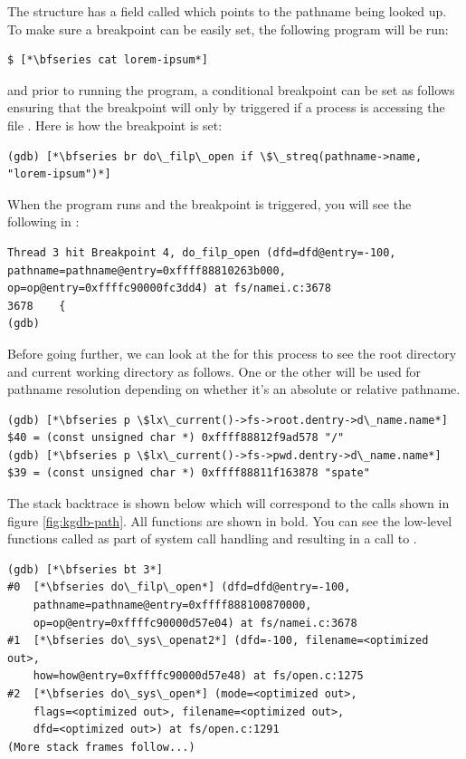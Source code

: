 \noindent
The  structure has a field called  which points to the pathname being looked up. To make sure a breakpoint can be easily set, the following program will be run:

\begin{lstlisting}
$ [*\bfseries cat lorem-ipsum*]
\end{lstlisting}

\noindent
and prior to running the program, a conditional breakpoint can be set as follows ensuring that the breakpoint will only by triggered if a process is accessing the file . Here is how the breakpoint is set:

\begin{lstlisting}
(gdb) [*\bfseries br do\_filp\_open if \$\_streq(pathname->name, "lorem-ipsum")*]
\end{lstlisting}

\noindent
When the program runs and the breakpoint is triggered, you will see the following in :

\begin{lstlisting}
Thread 3 hit Breakpoint 4, do_filp_open (dfd=dfd@entry=-100, 
pathname=pathname@entry=0xffff88810263b000, 
op=op@entry=0xffffc90000fc3dd4) at fs/namei.c:3678
3678	{
(gdb) 
\end{lstlisting}

\noindent
Before going further, we can look at the  for this process to see the root directory and current working directory as follows. One or the other will be used for pathname resolution depending on whether it's an absolute or relative pathname.

\begin{lstlisting}
(gdb) [*\bfseries p \$lx\_current()->fs->root.dentry->d\_name.name*]
$40 = (const unsigned char *) 0xffff88812f9ad578 "/"
(gdb) [*\bfseries p \$lx\_current()->fs->pwd.dentry->d\_name.name*]
$39 = (const unsigned char *) 0xffff88811f163878 "spate"
\end{lstlisting}

\noindent
The stack backtrace is shown below which will correspond to the calls shown in figure \ref{fig:kgdb-path}. All functions are shown in bold. You can see the low-level functions called as part of system call handling and resulting in a call to .

\begin{lstlisting}
(gdb) [*\bfseries bt 3*]
#0  [*\bfseries do\_filp\_open*] (dfd=dfd@entry=-100, 
    pathname=pathname@entry=0xffff888100870000, 
    op=op@entry=0xffffc90000d57e04) at fs/namei.c:3678
#1  [*\bfseries do\_sys\_openat2*] (dfd=-100, filename=<optimized out>, 
    how=how@entry=0xffffc90000d57e48) at fs/open.c:1275
#2  [*\bfseries do\_sys\_open*] (mode=<optimized out>, 
    flags=<optimized out>, filename=<optimized out>, 
    dfd=<optimized out>) at fs/open.c:1291
(More stack frames follow...)
\end{lstlisting}

